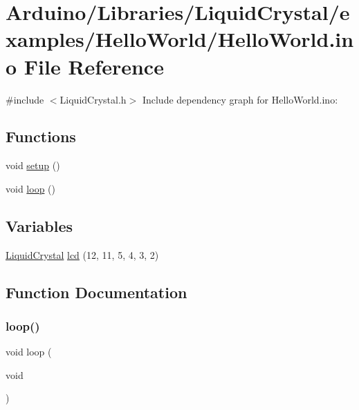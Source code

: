 \hypertarget{_hello_world_8ino}{}\section{Arduino/\+Libraries/\+Liquid\+Crystal/examples/\+Hello\+World/\+Hello\+World.ino File Reference}
\label{_hello_world_8ino}
{\ttfamily \#include $<$Liquid\+Crystal.\+h$>$}\newline
Include dependency graph for Hello\+World.\+ino\+:
\subsection*{Functions}
\begin{DoxyCompactItemize}
\item 
void \hyperlink{_hello_world_8ino_a4fc01d736fe50cf5b977f755b675f11d}{setup} ()
\item 
void \hyperlink{_hello_world_8ino_afe461d27b9c48d5921c00d521181f12f}{loop} ()
\end{DoxyCompactItemize}
\subsection*{Variables}
\begin{DoxyCompactItemize}
\item 
\hyperlink{class_liquid_crystal}{Liquid\+Crystal} \hyperlink{_hello_world_8ino_a7226623e632d4109904c86009c9f3b60}{lcd} (12, 11, 5, 4, 3, 2)
\end{DoxyCompactItemize}


\subsection{Function Documentation}
\mbox{\label{_hello_world_8ino_afe461d27b9c48d5921c00d521181f12f}} 
\subsubsection{\texorpdfstring{loop()}{loop()}}
{\footnotesize\ttfamily void loop (\begin{DoxyParamCaption}\item[{void}]{ }\end{DoxyParamCaption})}


